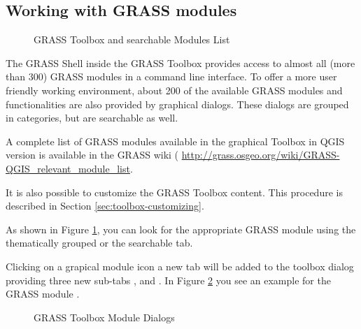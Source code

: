 \subsection{Working with GRASS modules}\label{grass_modules}

\begin{figure}[ht]
\centering
   \hspace{0.5cm}
\caption{GRASS Toolbox and searchable Modules List \nixcaption}\label{fig:grass_modules}
\end{figure}

The GRASS Shell inside the GRASS Toolbox provides access to almost all (more
than 300) GRASS modules in a command line interface. To offer a more user
friendly working environment, about 200 of the available GRASS modules and
functionalities are also provided by graphical dialogs. These dialogs are
grouped in categories, but are searchable as well. 

A complete list of GRASS modules available in the graphical Toolbox in QGIS version \CURRENT
is available in the GRASS wiki ( \url{http://grass.osgeo.org/wiki/GRASS-QGIS_relevant_module_list}. 

It is also possible to customize the GRASS Toolbox content. This procedure is described in Section
\ref{sec:toolbox-customizing}.

As shown in Figure \ref{fig:grass_modules}, you can look for the appropriate
GRASS module using the thematically grouped  or the
searchable  tab.

Clicking on a grapical module icon a new tab will be added to the toolbox
dialog providing three new sub-tabs ,  and
. In Figure \ref{fig:grass_module_dialog} you see an example
for the GRASS module .

\begin{figure}[h]
\centering
   \hspace{1cm}
   \hspace{1cm}
\caption{GRASS Toolbox Module Dialogs \nixcaption}\label{fig:grass_module_dialog}
\end{figure}
\FloatBarrier
{}

